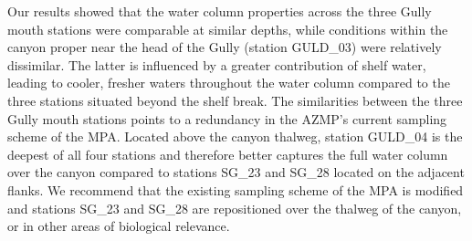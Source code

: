 \documentclass[12pt]{article}\usepackage[]{graphicx}\usepackage[]{color}
\begin{document}
Our results showed that the water column properties across the three Gully mouth stations were comparable at similar depths, while conditions within the canyon proper near the head of the Gully (station GULD\_03) were relatively dissimilar. The latter is influenced by a greater contribution of shelf water, leading to cooler, fresher waters throughout the water column compared to the three stations situated beyond the shelf break. The similarities between the three Gully mouth stations points to a redundancy in the AZMP's current sampling scheme of the MPA. Located above the canyon thalweg, station GULD\_04 is the deepest of all four stations and therefore better captures the full water column over the canyon compared to stations SG\_23 and SG\_28 located on the adjacent flanks. We recommend that the existing sampling scheme of the MPA is modified and stations SG\_23 and SG\_28 are repositioned over the thalweg of the canyon, or in other areas of biological relevance.
\end{document}
